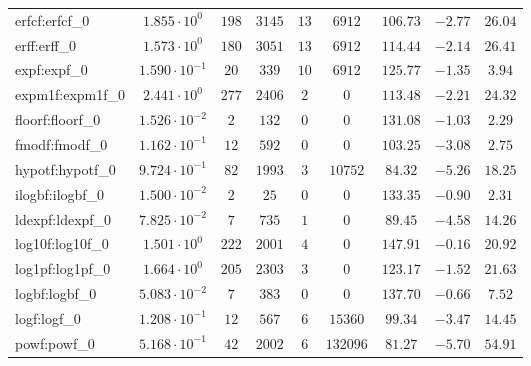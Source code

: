 \begin{tabular}{|l|c|c|c|c|c|c|c|c|}
erfcf:erfcf\_0               & $ 1.855 \cdot 10^{0}  $ & $ 198    $ & $ 3145  $ & $ 13  $ & $ 6912   $ & $ 106.73      $ & $ -2.77   $ & $ 26.04   $ \\
erff:erff\_0                 & $ 1.573 \cdot 10^{0}  $ & $ 180    $ & $ 3051  $ & $ 13  $ & $ 6912   $ & $ 114.44      $ & $ -2.14   $ & $ 26.41   $ \\
expf:expf\_0                 & $ 1.590 \cdot 10^{-1} $ & $ 20     $ & $ 339   $ & $ 10  $ & $ 6912   $ & $ 125.77      $ & $ -1.35   $ & $ 3.94    $ \\
expm1f:expm1f\_0             & $ 2.441 \cdot 10^{0}  $ & $ 277    $ & $ 2406  $ & $ 2   $ & $ 0      $ & $ 113.48      $ & $ -2.21   $ & $ 24.32   $ \\
floorf:floorf\_0             & $ 1.526 \cdot 10^{-2} $ & $ 2      $ & $ 132   $ & $ 0   $ & $ 0      $ & $ 131.08      $ & $ -1.03   $ & $ 2.29    $ \\
fmodf:fmodf\_0               & $ 1.162 \cdot 10^{-1} $ & $ 12     $ & $ 592   $ & $ 0   $ & $ 0      $ & $ 103.25      $ & $ -3.08   $ & $ 2.75    $ \\
hypotf:hypotf\_0             & $ 9.724 \cdot 10^{-1} $ & $ 82     $ & $ 1993  $ & $ 3   $ & $ 10752  $ & $ 84.32       $ & $ -5.26   $ & $ 18.25   $ \\
ilogbf:ilogbf\_0             & $ 1.500 \cdot 10^{-2} $ & $ 2      $ & $ 25    $ & $ 0   $ & $ 0      $ & $ 133.35      $ & $ -0.90   $ & $ 2.31    $ \\
ldexpf:ldexpf\_0             & $ 7.825 \cdot 10^{-2} $ & $ 7      $ & $ 735   $ & $ 1   $ & $ 0      $ & $ 89.45       $ & $ -4.58   $ & $ 14.26   $ \\
log10f:log10f\_0             & $ 1.501 \cdot 10^{0}  $ & $ 222    $ & $ 2001  $ & $ 4   $ & $ 0      $ & $ 147.91      $ & $ -0.16   $ & $ 20.92   $ \\
log1pf:log1pf\_0             & $ 1.664 \cdot 10^{0}  $ & $ 205    $ & $ 2303  $ & $ 3   $ & $ 0      $ & $ 123.17      $ & $ -1.52   $ & $ 21.63   $ \\
logbf:logbf\_0               & $ 5.083 \cdot 10^{-2} $ & $ 7      $ & $ 383   $ & $ 0   $ & $ 0      $ & $ 137.70      $ & $ -0.66   $ & $ 7.52    $ \\
logf:logf\_0                 & $ 1.208 \cdot 10^{-1} $ & $ 12     $ & $ 567   $ & $ 6   $ & $ 15360  $ & $ 99.34       $ & $ -3.47   $ & $ 14.45   $ \\
powf:powf\_0                 & $ 5.168 \cdot 10^{-1} $ & $ 42     $ & $ 2002  $ & $ 6   $ & $ 132096 $ & $ 81.27       $ & $ -5.70   $ & $ 54.91   $ \\

\end{tabular}
